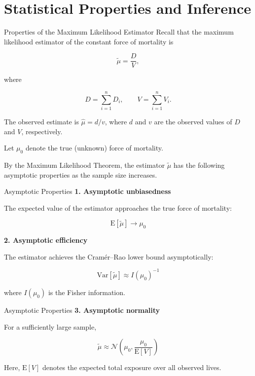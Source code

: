 \documentclass[
  ignorenonframetext,
  aspectratio=169,
]{beamer}
\begin{document}
\section{Statistical Properties and
Inference}\label{statistical-properties-and-inference}

\begin{frame}{Properties of the Maximum Likelihood Estimator}
\protect{}\label{properties-of-the-maximum-likelihood-estimator}
Recall that the maximum likelihood estimator of the constant force of
mortality is

\[
\tilde{\mu}=\frac{D}{V},
\]

where

\[
D=\sum_{i=1}^{n}D_i,
\qquad
V=\sum_{i=1}^{n}V_i.
\]

The observed estimate is \(\hat{\mu}=d/v\), where \(d\) and \(v\) are
the observed values of \(D\) and \(V\), respectively.

Let \(\mu_0\) denote the true (unknown) force of mortality.

By the Maximum Likelihood Theorem, the estimator \(\tilde{\mu}\) has the
following asymptotic properties as the sample size increases.
\end{frame}

\begin{frame}{Asymptotic Properties}
\protect{}\label{asymptotic-properties}
\textbf{1. Asymptotic unbiasedness}

The expected value of the estimator approaches the true force of
mortality:

\[
\boxed{
\mathrm{E}[\tilde{\mu}]
\longrightarrow \mu_0
}
\]

\textbf{2. Asymptotic efficiency}

The estimator achieves the Cramér--Rao lower bound asymptotically:

\[
\boxed{
\mathrm{Var}[\tilde{\mu}]
\approx I(\mu_0)^{-1}
}
\]

where \(I(\mu_0)\) is the Fisher information.
\end{frame}

\begin{frame}{Asymptotic Properties}
\protect{}\label{asymptotic-properties-1}
\textbf{3. Asymptotic normality}

For a sufficiently large sample,

\[
\boxed{
\tilde{\mu}
\approx
\mathcal{N}\left(
\mu_0,\frac{\mu_0}{\mathrm{E}[V]}
\right)
}
\]

Here, \(\mathrm{E}[V]\) denotes the expected total exposure over all
observed lives.
\end{frame}
\end{document}
